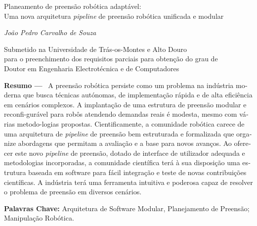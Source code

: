 \begin{otherlanguage}{portuguese}

\begin{center}
\large{Planeamento de preensão robótica adaptável: \\ Uma nova arquitetura \textit{pipeline} de preensão robótica unificada e modular}

\vskip5mm
\normalsize{\textit{João Pedro Carvalho de Souza}}


\vskip5mm
\small{Submetido na Universidade de Trás-os-Montes e Alto Douro \\
para o preenchimento dos requisitos parciais para obtenção do grau de \\
Doutor em Engenharia Electrotécnica e de Computadores}
\end{center}



\textbf{Resumo ---}
\
A preensão robótica persiste como um problema na indústria moderna que busca técnicas autónomas, de implementação rápida e de alta eficiência em cenários complexos. A implantação de uma estrutura de preensão modular e reconfi-gurável para robôs atendendo demandas reais é modesta, mesmo com várias metodo-logias propostas. Cientificamente, a comunidade robótica carece de uma arquitetura de \textit{pipeline} de preensão bem estruturada e formalizada que organize abordagens que permitam a avaliação e a base para novos avanços. Ao oferecer este novo \textit{pipeline} de preensão, dotado de interface de utilizador adequada e metodologias incorporadas, a comunidade científica terá à sua disposição uma estrutura baseada em software para fácil integração e teste de novas contribuições científicas. A indústria terá uma ferramenta intuitiva e poderosa capaz de resolver o problema de preensão em diversos cenários.

\textbf{Palavras Chave:} Arquitetura de Software Modular, Planejamento de Preensão; Manipulação Robótica.

\end{otherlanguage}
